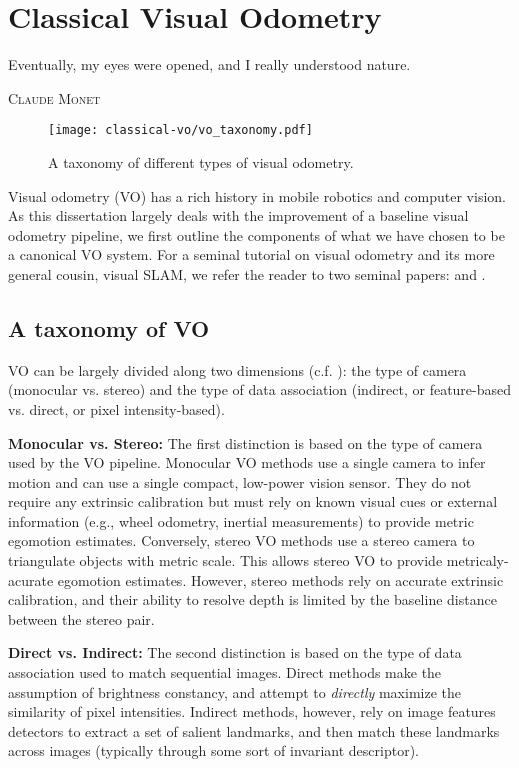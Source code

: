 \chapter{Classical Visual Odometry}
\label{ch:vo}
\epigraph{Eventually, my eyes were opened, and I really understood nature.}{\textsc{Claude Monet}}

\begin{figure}[h!]
\begin{center}
		\texttt{[image: classical-vo/vo\_taxonomy.pdf]}
		\caption{A taxonomy of different types of visual odometry.}
  	\label{fig:vo_taxonomy}
\end{center}
\end{figure}


Visual odometry (VO) has a rich history in mobile robotics and computer vision. As this dissertation largely deals with the improvement of a baseline visual odometry pipeline, we first outline the components of what we have chosen to be a canonical VO system. For a seminal tutorial on visual odometry and its more general cousin, visual SLAM, we refer the reader to two seminal papers: \cite{Scaramuzza2011-qr} and \cite{Cadena2016-ds}.

\section{A taxonomy of VO}

VO can be largely divided along two dimensions (c.f. ): the type of camera (monocular vs. stereo) and the type of data association (indirect, or feature-based vs. direct, or pixel intensity-based). 

\textbf{Monocular vs. Stereo:}
The first distinction is based on the type of camera used by the VO pipeline. Monocular VO methods use a single camera to infer motion and can use a single compact, low-power vision sensor. They do not require any extrinsic calibration but must rely on known visual cues or external information (e.g., wheel odometry, inertial measurements) to provide metric egomotion estimates. Conversely, stereo VO methods use a stereo camera to triangulate objects with metric scale. This allows stereo VO to provide metricaly-acurate egomotion estimates. However, stereo methods rely on accurate extrinsic calibration, and their ability to resolve depth is limited by the baseline distance between the stereo pair. 

\textbf{Direct vs. Indirect:}
The second distinction is based on the type of data association used to match sequential images. Direct methods make the assumption of brightness constancy, and attempt to \textit{directly} maximize the similarity of pixel intensities. Indirect methods, however, rely on image features detectors to extract a set of salient landmarks, and then match these landmarks across images (typically through some sort of invariant descriptor).

